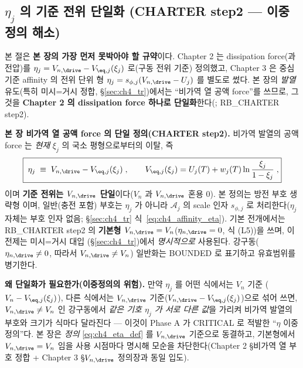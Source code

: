 \subsection{$\eta_j$ 의 기준 전위 단일화 (CHARTER step2 — 이중정의 해소)}\label{sec:ch4_eta_single}
본 절은 \textbf{본 장의 가장 먼저 못박아야 할 규약}이다. Chapter 2 는 dissipation force(과전압)를
$\eta_j=V_{n,\drive}-V_{\eq,j}(\xi_j)$ 로(구동 전위 기준) 정의했고, Chapter 3 은 중심 기준 affinity 의
전위 단위 형 $\eta_j=s_{\phi,j}(V_{n,\drive}-U_j)$ 를 별도로 썼다. 본 장의 \emph{발열} 유도(특히 미시=거시
정합, \S\ref{sec:ch4_tr})에서는 ``비가역 열 공액 force''를 쓰므로, 그것을 \textbf{Chapter 2 의 dissipation
force 하나로 단일화}한다(; RB\_CHARTER step2).
\begin{keybox}
\textbf{본 장 비가역 열 공액 force 의 단일 정의(CHARTER step2).} 비가역 발열의 공액 force 는 \emph{현재}
$\xi_j$ 의 국소 평형으로부터의 이탈, 즉
\begin{equation}
\boxed{\;\eta_j\;\equiv\;V_{n,\drive}-V_{\eq,j}(\xi_j)\;,\qquad V_{\eq,j}(\xi_j)=U_j(T)+w_j(T)\ln\frac{\xi_j}{1-\xi_j}\;,}
\label{eq:ch4_eta_def}
\end{equation}
이며 \textbf{기준 전위는 $V_{n,\drive}$ 단일}이다($V_n$ 과 $V_{n,\drive}$ 혼용 0). 본 정의는 방전 부호 생략형
이며, 일반(충전 포함) 부호는 $\eta_j$ 가 아니라 $\mathcal A_j$ 의 scale 인자 $s_{\phi,j}$ 로 처리한다($\eta_j$ 자체는
부호 인자 없음; \S\ref{sec:ch4_tr} 식~\eqref{eq:ch4_affinity_eta}). 기본 전개에서는 RB\_CHARTER
step2 의 \textbf{기본형 $V_{n,\drive}=V_n$}($\eta_{n,\drive}=0$, 식 (L5))을 쓰며, 이 전제는 미시=거시 대입
(\S\ref{sec:ch4_tr})에서 \emph{명시적으로} 사용된다. 강구동($\eta_{n,\drive}\ne0$, 따라서 $V_{n,\drive}\ne V_n$)
일반화는 BOUNDED 로 표기하고 유효범위를 병기한다.
\end{keybox}
\textbf{왜 단일화가 필요한가(이중정의의 위험).} 만약 $\eta_j$ 를 어떤 식에서는 $V_n$ 기준
($V_n-V_{\eq,j}(\xi_j)$), 다른 식에서는 $V_{n,\drive}$ 기준($V_{n,\drive}-V_{\eq,j}(\xi_j)$)으로 섞어 쓰면,
$V_{n,\drive}\ne V_n$ 인 강구동에서 \emph{같은 기호 $\eta_j$ 가 서로 다른 값}을 가리켜 비가역 발열의 부호와
크기가 식마다 달라진다 — 이것이 Phase A 가 CRITICAL 로 적발한 ``$\eta$ 이중정의''다. 본 장은 \emph{정의}
\eqref{eq:ch4_eta_def} 를 $V_{n,\drive}$ 기준으로 동결하고, 기본형에서 $V_{n,\drive}=V_n$ 임을 사용 시점마다
명시해 모순을 차단한다(Chapter 2 \S 비가역 열 부호 정합 + Chapter 3 \S$V_{n,\drive}$ 정의장과 동일 입도).

